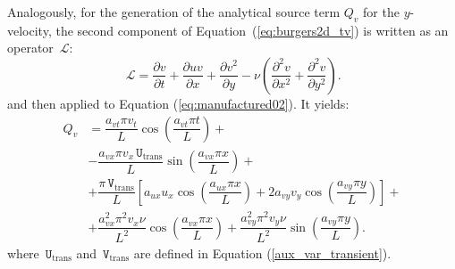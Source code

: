 \documentclass[10pt]{article}
\newcommand{\diff}[2] {\dfrac{\partial #1}{\partial #2}}
\newcommand{\Lo}{\,\mathcal{L}}
\newcommand{\U}{\,\mathtt{U}}
\newcommand{\V}{\,\mathtt{V}}
\begin{document}
Analogously, for the generation of the analytical source term $Q_v$ for the $y$-velocity, the second component of  Equation~(\ref{eq:burgers2d_tv}) is written as an  operator $\Lo$:
\begin{equation}
  \label{eq:burgers2d_13}
  \Lo = \diff{ v}{t}+ \diff{ u v}{x} + \diff{  v^2 }{y}-\nu \left( \diff{^2v}{ x^2}+ \diff{^2v }{y^2}\right).
\end{equation}
and then applied to Equation  (\ref{eq:manufactured02}). It yields:
\begin{equation}
\begin{split}
Q_v &= \dfrac{a_{vt} \pi v_t }{L}\cos\left(\dfrac{a_{vt} \pi t}{L}\right)+\\
 &-\dfrac{a_{vx} \pi v_x \U_\text{trans} }{L}\sin\left(\dfrac{a_{vx} \pi x}{L}\right)+\\
 &+\dfrac{\pi \V_\text{trans}}{L}\left[a_{ux} u_x \cos\left(\dfrac{a_{ux} \pi x}{L}\right)+2 a_{vy} v_y \cos\left(\dfrac{a_{vy} \pi y}{L}\right)\right] +\\  &+\dfrac{a_{vx}^2 \pi^2 v_x \nu }{L^2}\cos\left(\dfrac{a_{vx} \pi x}{L}\right)+\dfrac{a_{vy}^2 \pi^2 v_y \nu }{L^2}\sin\left(\dfrac{a_{vy} \pi y}{L}\right).
\end{split}
\end{equation}
where  $\U_\text{trans}$ and $\V_\text{trans}$ are defined in  Equation (\ref{aux_var_transient}).
\end{document}
